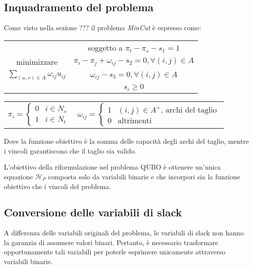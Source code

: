 \documentclass{article}
\begin{document}
\subsection{Inquadramento del problema}
Come visto nella sezione ??? il problema \emph{MinCut} è espresso come:
\begin{center}
\begin{table}[H]
    \centering
    \begin{tabular}{c|c}
        & soggetto a $\pi_t - \pi_s - s_1 = 1$ \\
        minimizzare & $\pi_i - \pi_j + \omega_{ij} - s_2= 0, \forall (i, j) \in A$\\
        $\sum_{(u, v) \in A} \omega_{ij}u_{ij}$ & $\omega_{ij} - s_3 = 0, \forall (i, j) \in A$\\
        & $s_i \geq 0$
    \end{tabular}
\end{table}

\begin{table}
    \centering
    \begin{tabular}{cc}
        $\pi_i = \begin{cases}
            0 & i \in N_s\\
            1 & i \in N_t
        \end{cases}$ 
        & 
        $\omega_{ij} = \begin{cases}
            1 & \text{$(i, j) \in A^+$, archi del taglio}\\
            0 & \text{altrimenti}
        \end{cases}$
    \end{tabular}
\end{table}
\end{center}

Dove la funzione obiettivo è la somma delle capacità degli archi del taglio, mentre i vincoli garantiscono che il taglio sia valido.

L'obiettivo della riformulazione nel problema QUBO è ottenere un'unica equazione $\mathcal{H}_P$ composta solo da variabili binarie e che incorpori sia la funzione obiettivo che i vincoli del problema.

\subsection{Conversione delle variabili di slack}
A differenza delle variabili originali del problema, le variabili di slack non hanno la garanzia di assumere valori binari. Pertanto, è necessario trasformare opportunamente tali variabili per poterle esprimere unicamente attraverso variabili binarie.
\end{document}
